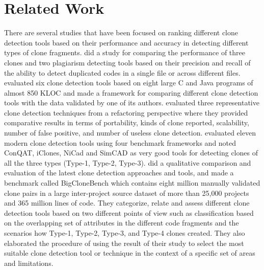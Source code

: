 \documentclass[review]{elsarticle}
\begin{document}
\section{Related Work}
\label{the-related-works}
There are several studies \cite{Roy09comparisonand, jeff-evaluating, 4288192Comparison, ScenarioBasedComparison} that have been focused on ranking different clone detection tools based on their performance and accuracy in detecting different types of clone fragments. \citet{BaileyBurdComparison} did a study for comparing the performance of three clones and two plagiarism detecting tools based on their precision and recall of the ability to detect duplicated codes in a single file or across different files.  \citet{4288192Comparison} evaluated six clone detection tools based on eight large C and Java programs of almost 850 KLOC and made a framework for comparing different clone detection tools with the data validated by one of its authors.  \citet{EvaluateRefactoring} evaluated three representative clone detection techniques from a refactoring perspective where they provided comparative results in terms of portability, kinds of clone reported, scalability, number of false positive, and number of useless clone detection.   \citet{jeff-evaluating} evaluated eleven modern clone detection tools using four benchmark frameworks and noted ConQAT, iClones, NiCad and SimCAD as very good tools for detecting clones of all the three types (Type-1, Type-2, Type-3). \citet{Roy09comparisonand} did a qualitative comparison and evaluation of the latest clone detection approaches and tools, and made a benchmark called BigCloneBench \cite{BigCloneBenchCKRoyJRCordy} which contains eight million manually validated clone pairs in a large inter-project source dataset of more than 25,000 projects and 365 million lines of code. They categorize, relate and assess different clone detection tools based on two different points of view such as classification based on the overlapping set of attributes in the different code fragments and the scenarios how Type-1, Type-2, Type-3, and Type-4 clones created. They also elaborated the procedure of using the result of their study to select the most suitable clone detection tool or technique in the context of a specific set of areas and limitations. \\
\end{document}
